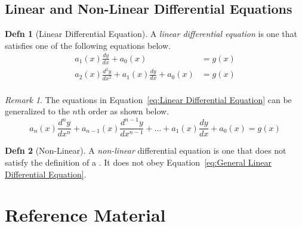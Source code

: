 \documentclass[10pt,letterpaper,final,twoside,notitlepage]{article}
\theoremstyle{plain}
\theoremstyle{definition}
\newtheorem{definition}{Defn}
\theoremstyle{remark}
\newtheorem{remark}{Remark}[definition]
\begin{document}
	\subsection{Linear and Non-Linear Differential Equations} \label{Linear vs. Non-Linear Differential Equations}
		\begin{definition}[Linear Differential Equation] \label{def:Linear Differential Equation}
			A \emph{linear differential equation} is one that satisfies one of the following equations below.
			\begin{equation} \label{eq:Linear Differential Equation}
				\begin{aligned}
					a_{1} \left( x \right) \frac{dy}{dx} + a_{0} \left( x \right) &= g \left( x \right) \\
					a_{2} \left( x \right) \frac{d^{2}y}{dx^{2}} + a_{1} \left( x \right) \frac{dy}{dx} + a_{0} \left( x \right) &= g \left( x \right) \\
				\end{aligned}
			\end{equation}
			\begin{remark}
				The equations in Equation~\eqref{eq:Linear Differential Equation} can be generalized to the $n$th order as shown below.
				\begin{equation} \label{eq:General Linear Differential Equation}
					a_{n} \left( x \right) \frac{d^{n}y}{dx^{n}} + a_{n-1} \left( x \right) \frac{d^{n-1}y}{dx^{n-1}} + \ldots + a_{1} \left( x \right) \frac{dy}{dx} + a_{0} \left( x \right) = g \left( x \right)
				\end{equation}
			\end{remark}
		\end{definition}
		\begin{definition}[Non-Linear] \label{def:Non-Linear Differential Equation}
			A \emph{non-linear} differential equation is one that does not satisfy the definition of a .
			It does not obey Equation~\eqref{eq:General Linear Differential Equation}.
		\end{definition}

\clearpage
\appendix
{}

\section{Reference Material} \label{sec:Reference Material}


\end{document}
